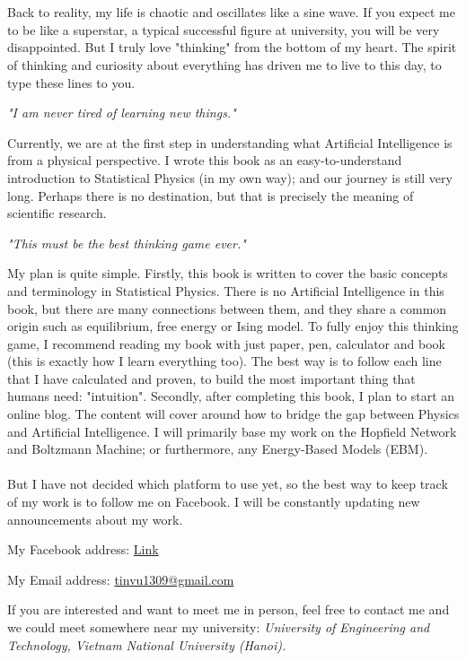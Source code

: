 \documentclass[phyai.tex]{subfiles}
\begin{document}
\\ \\
\indent Back to reality, my life is chaotic and oscillates like a sine wave. If you expect me to be like a superstar, a typical successful figure at university, you will be very disappointed. But I truly love "thinking" from the bottom of my heart. The spirit of thinking and curiosity about everything has driven me to live to this day, to type these lines to you.
\begin{center}
	\textit{{"I am never tired of learning new things."}}
\end{center}
Currently, we are at the first step in understanding what Artificial Intelligence is from a physical perspective. I wrote this book as an easy-to-understand introduction to Statistical Physics (in my own way); and our journey is still very long. Perhaps there is no destination, but that is precisely the meaning of scientific research.
\begin{center}
	\textit{"This must be the best thinking game ever."}
\end{center}
My plan is quite simple. Firstly, this book is written to cover the basic concepts and terminology in Statistical Physics. There is no Artificial Intelligence in this book, but there are many connections between them, and they share a common origin such as equilibrium, free energy or Ising model. To fully enjoy this thinking game, I recommend reading my book with just paper, pen, calculator and book (this is exactly how I learn everything too). The best way is to follow each line that I have calculated and proven, to build the most important thing that humans need: "intuition". Secondly, after completing this book, I plan to start an online blog. The content will cover around how to bridge the gap between Physics and Artificial Intelligence. I will primarily base my work on the Hopfield Network and Boltzmann Machine; or furthermore, any Energy-Based Models (EBM).
\\ \\
\indent But I have not decided which platform to use yet, so the best way to keep track of my work is to follow me on Facebook. I will be constantly updating new announcements about my work.
\begin{flushleft}
	My Facebook address: \href{https://www.facebook.com/profile.php?id=61577979788883}{Link}
\end{flushleft}
\begin{flushleft}
	My Email address: \url{tinvu1309@gmail.com}
\end{flushleft}
If you are interested and want to meet me in person, feel free to contact me and we could meet somewhere near my university: \textit{University of Engineering and Technology, Vietnam National University (Hanoi).}
\end{document}
